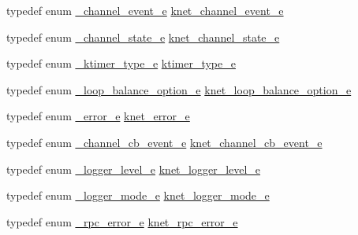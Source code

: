 \begin{DoxyCompactItemize}
typedef enum \hyperlink{a00054_a1460362ccf3a6ba930a1a3ac2f73f3ea_a1460362ccf3a6ba930a1a3ac2f73f3ea}{\+\_\+channel\+\_\+event\+\_\+e} \hyperlink{a00054_accd62b4c787cfb91e81aa14210302863_accd62b4c787cfb91e81aa14210302863}{knet\+\_\+channel\+\_\+event\+\_\+e}
\item 
typedef enum \hyperlink{a00054_a18bbc160902cdba0f52f5a3cd879b47f_a18bbc160902cdba0f52f5a3cd879b47f}{\+\_\+channel\+\_\+state\+\_\+e} \hyperlink{a00054_a74ff83eaafca5c7093accdc65c6b0646_a74ff83eaafca5c7093accdc65c6b0646}{knet\+\_\+channel\+\_\+state\+\_\+e}
\item 
typedef enum \hyperlink{a00054_a7945681f6589a5f4f6cf55f4f4092d28_a7945681f6589a5f4f6cf55f4f4092d28}{\+\_\+ktimer\+\_\+type\+\_\+e} \hyperlink{a00054_a42e924130e6eb3bd995344f6d3f3e918_a42e924130e6eb3bd995344f6d3f3e918}{ktimer\+\_\+type\+\_\+e}
\item 
typedef enum \hyperlink{a00054_a0f82b35b603ffed92ea1a74205f10781_a0f82b35b603ffed92ea1a74205f10781}{\+\_\+loop\+\_\+balance\+\_\+option\+\_\+e} \hyperlink{a00054_aa131da8fb72468b39b6ee0e2d46b17b2_aa131da8fb72468b39b6ee0e2d46b17b2}{knet\+\_\+loop\+\_\+balance\+\_\+option\+\_\+e}
\item 
typedef enum \hyperlink{a00054_ad8bc998d415be9115a064a8307df0ed5_ad8bc998d415be9115a064a8307df0ed5}{\+\_\+error\+\_\+e} \hyperlink{a00054_abc9a047a9545c201adf70e4793ed0689_abc9a047a9545c201adf70e4793ed0689}{knet\+\_\+error\+\_\+e}
\item 
typedef enum \hyperlink{a00054_a2217ac7363dbae279d056a361d122915_a2217ac7363dbae279d056a361d122915}{\+\_\+channel\+\_\+cb\+\_\+event\+\_\+e} \hyperlink{a00054_a2fd2faf971268f5b682ab375c455f7c9_a2fd2faf971268f5b682ab375c455f7c9}{knet\+\_\+channel\+\_\+cb\+\_\+event\+\_\+e}
\item 
typedef enum \hyperlink{a00054_a4e764c733cf98ee587ca17412fca9148_a4e764c733cf98ee587ca17412fca9148}{\+\_\+logger\+\_\+level\+\_\+e} \hyperlink{a00054_a8bb61ec2ff976625d0707a81c1ccc149_a8bb61ec2ff976625d0707a81c1ccc149}{knet\+\_\+logger\+\_\+level\+\_\+e}
\item 
typedef enum \hyperlink{a00054_a95d677e6aef6e1699b92848e4497c23a_a95d677e6aef6e1699b92848e4497c23a}{\+\_\+logger\+\_\+mode\+\_\+e} \hyperlink{a00054_a3ad8e017e53143bca2ada78d2bfa30e1_a3ad8e017e53143bca2ada78d2bfa30e1}{knet\+\_\+logger\+\_\+mode\+\_\+e}
\item 
typedef enum \hyperlink{a00054_a5a9afdfc8281994f0692b49499d731bf_a5a9afdfc8281994f0692b49499d731bf}{\+\_\+rpc\+\_\+error\+\_\+e} \hyperlink{a00054_a09f6be2164ffa374198a4ab2af2e1966_a09f6be2164ffa374198a4ab2af2e1966}{knet\+\_\+rpc\+\_\+error\+\_\+e}

\end{DoxyCompactItemize}
